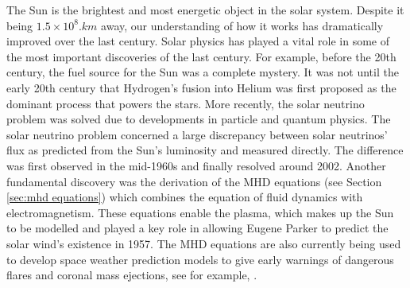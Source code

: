

The Sun is the brightest and most energetic object in the solar system. Despite it being $1.5\times10^8\si{.km}$ away, our understanding of how it works has dramatically improved over the last century. Solar physics has played a vital role in some of the most important discoveries of the last century. For example, before the 20th century, the fuel source for the Sun was a complete mystery. It was not until the early 20th century that Hydrogen's fusion into Helium was first proposed as the dominant process that powers the stars. More recently, the solar neutrino problem was solved due to developments in particle and quantum physics. The solar neutrino problem concerned a large discrepancy between solar neutrinos' flux as predicted from the Sun's luminosity and measured directly. The difference was first observed in the mid-1960s and finally resolved around 2002. Another fundamental discovery was the derivation of the MHD equations (see Section \ref{sec:mhd equations}) which combines the equation of fluid dynamics with electromagnetism. These equations enable the plasma, which makes up the Sun to be modelled and played a key role in allowing Eugene Parker to predict the solar wind's existence in 1957. The MHD equations are also currently being used to develop space weather prediction models to give early warnings of dangerous flares and coronal mass ejections, see for example, \citet{Feynman2000}.

